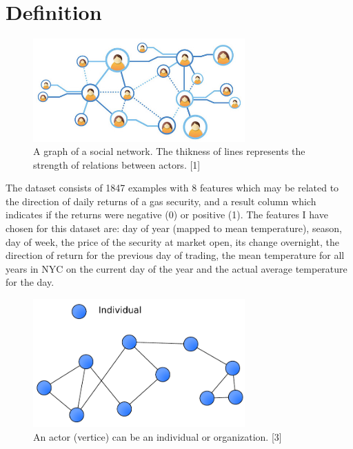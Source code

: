 \documentclass[conference,letterpaper]{IEEEtran}
\begin{document}
\section{Definition}

\begin{center}
\begin{figure}[hb]
\centering
\includegraphics[width=3.2in]{social-network-grid}
\caption{
A graph of a social network. The thikness of lines represents the strength of relations between actors. [1]
}
\label{fig_sim}
\end{figure}
\end{center}

The dataset consists of 1847 examples with 8 features which may be related to the direction of daily returns of a gas security,
and a result column which indicates if the returns were negative (0) or positive (1). The features I have chosen for this dataset 
are: day of year (mapped to mean temperature), season, day of week, the price of the security at market open, its change overnight, 
the direction of return for the previous day of trading, the mean temperature for all years in NYC on the current day of the year
and the actual average temperature for the day.\\

\begin{center}
\begin{figure}[hb]
\centering
\includegraphics[width=3.2in]{social-network}
\caption{
An actor (vertice) can be an individual or organization. [3]
}
\label{fig_sim}
\end{figure}
\end{center}
\end{document}
